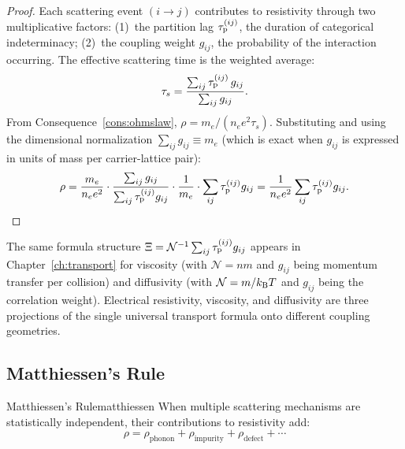 \begin{proof}
Each scattering event $(i \to j)$ contributes to resistivity through two
multiplicative factors: (1)~the partition lag $\tau_{\mathrm{p}}^{(ij)}$, the duration
of categorical indeterminacy; (2)~the coupling weight $g_{ij}$, the
probability of the interaction occurring.  The effective scattering time is
the weighted average:
\begin{equation}
  \tau_s = \frac{\sum_{ij}\tau_{\mathrm{p}}^{(ij)}\,g_{ij}}{\sum_{ij}g_{ij}}.
  \label{eq:ch18-taueff}
\end{equation}
From Consequence~\ref{cons:ohmslaw}, $\rho = m_e/(n_e e^2\tau_s)$.
Substituting and using the dimensional normalization
$\sum_{ij}g_{ij} \equiv m_e$ (which is exact when $g_{ij}$ is expressed
in units of mass per carrier-lattice pair):
\begin{equation}
  \rho = \frac{m_e}{n_e e^2} \cdot \frac{\sum_{ij}g_{ij}}
    {\sum_{ij}\tau_{\mathrm{p}}^{(ij)}g_{ij}} \cdot \frac{1}{m_e}
    \cdot \sum_{ij}\tau_{\mathrm{p}}^{(ij)}g_{ij}
    = \frac{1}{n_e e^2}\sum_{ij}\tau_{\mathrm{p}}^{(ij)}g_{ij}.
\end{equation}
\end{proof}

\begin{remark}
  The same formula structure $\Xi = \mathcal{N}^{-1}\sum_{ij}
  \tau_{\mathrm{p}}^{(ij)}g_{ij}$ appears in Chapter~\ref{ch:transport} for
  viscosity (with $\mathcal{N} = n m$ and $g_{ij}$ being momentum transfer
  per collision) and diffusivity (with $\mathcal{N} = m/k_{\mathrm{B}} T$ and $g_{ij}$
  being the correlation weight).  Electrical resistivity, viscosity, and
  diffusivity are three projections of the single universal transport
  formula onto different coupling geometries.
\end{remark}

\subsection{Matthiessen's Rule}

\begin{consequence}{Matthiessen's Rule}{matthiessen}
When multiple scattering mechanisms are statistically independent,
their contributions to resistivity add:
\begin{equation}
  \rho = \rho_{\mathrm{phonon}} + \rho_{\mathrm{impurity}}
       + \rho_{\mathrm{defect}} + \cdots
  \label{eq:ch18-matthiessen}
\end{equation}
\end{consequence}

